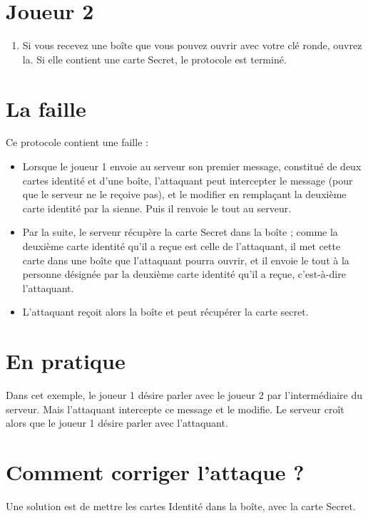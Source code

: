 \documentclass[a4paper,10pt]{article}
\begin{document}
\section{Joueur 2}
\begin{enumerate}
	\item Si vous recevez une boîte que vous pouvez ouvrir avec votre clé ronde, ouvrez la. Si elle contient une carte Secret, le protocole est terminé.
\end{enumerate}

\section{La faille}
Ce protocole contient une faille :
\begin{itemize}
	\item Lorsque le joueur 1 envoie au serveur son premier message, constitué de deux cartes identité et d'une boîte, l'attaquant peut intercepter le message (pour que le serveur ne le reçoive pas), et le modifier en remplaçant la deuxième carte identité par la sienne. Puis il renvoie le tout au serveur.
 \item Par la suite, le serveur récupère la carte Secret dans la boîte ; comme la deuxième carte identité qu'il a reçue est celle de l'attaquant, il met cette carte dans une boîte que l'attaquant pourra ouvrir, et il envoie le tout à la personne désignée par la deuxième carte identité qu'il a reçue, c'est-à-dire l'attaquant.
\item L'attaquant reçoit alors la boîte et peut récupérer la carte secret.
\end{itemize}

\section{En pratique}
Dans cet exemple, le joueur 1 désire parler avec le joueur 2 par l'intermédiaire du serveur. Mais l'attaquant intercepte ce message et le modifie. Le serveur croît alors que le joueur 1 désire parler avec l'attaquant.

\section{Comment corriger l'attaque ?}
Une solution est de mettre les cartes Identité dans la boîte, avec la carte Secret.
\end{document}
